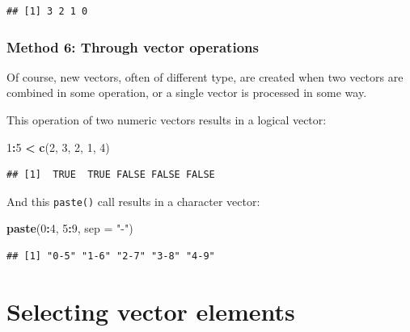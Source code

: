 \documentclass[]{book}
\newenvironment{Shaded}{\begin{snugshade}}{\end{snugshade}}
\newcommand{\DataTypeTok}[1]{\textcolor[rgb]{0.13,0.29,0.53}{#1}}
\newcommand{\DecValTok}[1]{\textcolor[rgb]{0.00,0.00,0.81}{#1}}
\newcommand{\KeywordTok}[1]{\textcolor[rgb]{0.13,0.29,0.53}{\textbf{#1}}}
\newcommand{\NormalTok}[1]{#1}
\newcommand{\OperatorTok}[1]{\textcolor[rgb]{0.81,0.36,0.00}{\textbf{#1}}}
\newcommand{\StringTok}[1]{\textcolor[rgb]{0.31,0.60,0.02}{#1}}
\begin{document}
\begin{verbatim}
## [1] 3 2 1 0
\end{verbatim}

\hypertarget{method-6-through-vector-operations}{%
\subsubsection*{Method 6: Through vector operations}\label{method-6-through-vector-operations}}

Of course, new vectors, often of different type, are created when two vectors are combined in some operation, or a single vector is processed in some way.

This operation of two numeric vectors results in a logical vector:

\begin{Shaded}
\begin{Highlighting}[]
\DecValTok{1}\OperatorTok{:}\DecValTok{5} \OperatorTok{<}\StringTok{ }\KeywordTok{c}\NormalTok{(}\DecValTok{2}\NormalTok{, }\DecValTok{3}\NormalTok{, }\DecValTok{2}\NormalTok{, }\DecValTok{1}\NormalTok{, }\DecValTok{4}\NormalTok{)}
\end{Highlighting}
\end{Shaded}

\begin{verbatim}
## [1]  TRUE  TRUE FALSE FALSE FALSE
\end{verbatim}

And this \texttt{paste()} call results in a character vector:

\begin{Shaded}
\begin{Highlighting}[]
\KeywordTok{paste}\NormalTok{(}\DecValTok{0}\OperatorTok{:}\DecValTok{4}\NormalTok{, }\DecValTok{5}\OperatorTok{:}\DecValTok{9}\NormalTok{, }\DataTypeTok{sep =} \StringTok{"-"}\NormalTok{)}
\end{Highlighting}
\end{Shaded}

\begin{verbatim}
## [1] "0-5" "1-6" "2-7" "3-8" "4-9"
\end{verbatim}

\hypertarget{selecting-vector-elements}{%
\section{Selecting vector elements}\label{selecting-vector-elements}}
\end{document}
